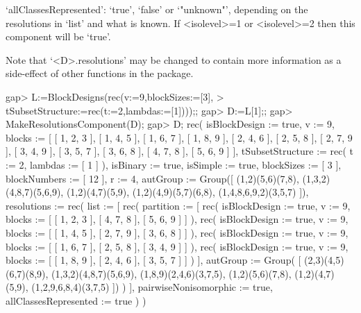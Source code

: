 `allClassesRepresented': `true', `false' or `"unknown"', depending on the
resolutions in `list' and what is known. If <isolevel>=1 or <isolevel>=2
then this component will be `true'.

Note that `<D>.resolutions' may be changed to contain more information
as a side-effect of other functions in the {\DESIGN} package.

\beginexample
gap> L:=BlockDesigns(rec(v:=9,blockSizes:=[3],
>          tSubsetStructure:=rec(t:=2,lambdas:=[1])));;
gap> D:=L[1];;
gap> MakeResolutionsComponent(D);
gap> D;
rec( isBlockDesign := true, v := 9, 
  blocks := [ [ 1, 2, 3 ], [ 1, 4, 5 ], [ 1, 6, 7 ], [ 1, 8, 9 ], 
      [ 2, 4, 6 ], [ 2, 5, 8 ], [ 2, 7, 9 ], [ 3, 4, 9 ], [ 3, 5, 7 ], 
      [ 3, 6, 8 ], [ 4, 7, 8 ], [ 5, 6, 9 ] ], 
  tSubsetStructure := rec( t := 2, lambdas := [ 1 ] ), isBinary := true, 
  isSimple := true, blockSizes := [ 3 ], blockNumbers := [ 12 ], r := 4, 
  autGroup := Group([ (1,2)(5,6)(7,8), (1,3,2)(4,8,7)(5,6,9), (1,2)(4,7)(5,9),
      (1,2)(4,9)(5,7)(6,8), (1,4,8,6,9,2)(3,5,7) ]), 
  resolutions := rec( list := [ rec( partition := 
                [ rec( isBlockDesign := true, v := 9, 
                      blocks := [ [ 1, 2, 3 ], [ 4, 7, 8 ], [ 5, 6, 9 ] ] ), 
                  rec( isBlockDesign := true, v := 9, 
                      blocks := [ [ 1, 4, 5 ], [ 2, 7, 9 ], [ 3, 6, 8 ] ] ), 
                  rec( isBlockDesign := true, v := 9, 
                      blocks := [ [ 1, 6, 7 ], [ 2, 5, 8 ], [ 3, 4, 9 ] ] ), 
                  rec( isBlockDesign := true, v := 9, 
                      blocks := [ [ 1, 8, 9 ], [ 2, 4, 6 ], [ 3, 5, 7 ] ] ) ],
              autGroup := Group(
                [ (2,3)(4,5)(6,7)(8,9), (1,3,2)(4,8,7)(5,6,9), 
                  (1,8,9)(2,4,6)(3,7,5), (1,2)(5,6)(7,8), (1,2)(4,7)(5,9), 
                  (1,2,9,6,8,4)(3,7,5) ]) ) ], pairwiseNonisomorphic := true, 
      allClassesRepresented := true ) )
\endexample

